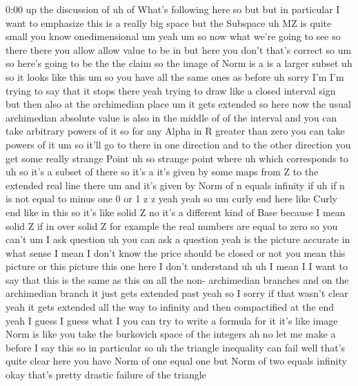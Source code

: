 \begin{unfinished}{0:00}
up  the  discussion  of  uh  of  What's
following  here  so  but  but  in  particular
I  want  to  emphasize  this  is  a  really  big
space  but  the  Subspace  uh  MZ  is  quite
small  you  know  onedimensional
um
yeah
um  so  now  what  we're  going  to
see  so  there  there  you  allow  allow  value
to  be  in  but  here  you  don't  that's
correct  so  um  so  here's  going  to  be  the
the
claim  so  the  image  of  Norm  is  a  is  a
larger
subset
uh  so  it  looks  like  this  um  so  you  have
all  the  same  ones  as
before  uh  sorry  I'm  I'm  trying  to  say
that  it  stops  there  yeah  trying  to  draw
like  a  closed  interval
sign  but  then  also  at  the  archimedian
place  um  it  gets  extended  so  here  now
the  usual  archimedian  absolute  value  is
also  in  the  middle  of  of  the
interval  and  you  can  take  arbitrary
powers  of  it  so  for  any  Alpha  in  R
greater  than  zero  you  can  take  powers  of
it
um  so  it'll  go  to  there  in  one  direction
and  to  the  other  direction  you  get  some
really  strange  Point  uh  so  strange
point  where  uh  which  corresponds  to
uh  so  it's  a  subset  of  there  so  it's  a
it's  given  by  some  maps  from  Z  to  the
extended  real  line  there  um  and  it's
given  by  Norm  of  n  equals  infinity  if  uh
if  n  is  not  equal  to  minus  one  0  or
1  z
z  yeah
yeah
so
um  curly  end  here  like  Curly  end  like  in
this  so  it's  like  solid  Z  no  it's  a
different  kind  of
Base  because  I  mean  solid  Z  if  in  over
solid  Z  for  example  the  real  numbers  are
equal  to
zero  so  you
can't
um  I  ask  question  uh  you  can  ask  a
question
yeah  is  the  picture
accurate  in  what  sense  I  mean  I  don't
know  the  price  should  be  closed  or
not  you  mean  this  picture  or  this
picture
this  one
here  I  don't  understand
uh
uh  I  mean  I  I  want  to  say  that  this  is
the  same  as  this  on  all  the  non-
archimedian  branches  and  on  the
archimedian  branch  it  just  gets  extended
past  yeah  so  I  sorry  if  that  wasn't
clear  yeah  it  gets  extended  all  the  way
to  infinity  and  then  compactified  at  the
end  yeah  I  guess  I  guess  what  I  you  can
try  to  write  a  formula  for  it  it's  like
image  Norm  is  like  you  take  the
burkovich  space  of  the  integers  ah  no
let  me  make  a  before  I  say  this  so  in
particular
so  uh  the  triangle  inequality  can
fail  well  that's  quite  clear  here  you
have  Norm  of  one  equal  one  but  Norm  of
two  equals  infinity  okay  that's  pretty
drastic  failure  of  the  triangle

\end{unfinished}
